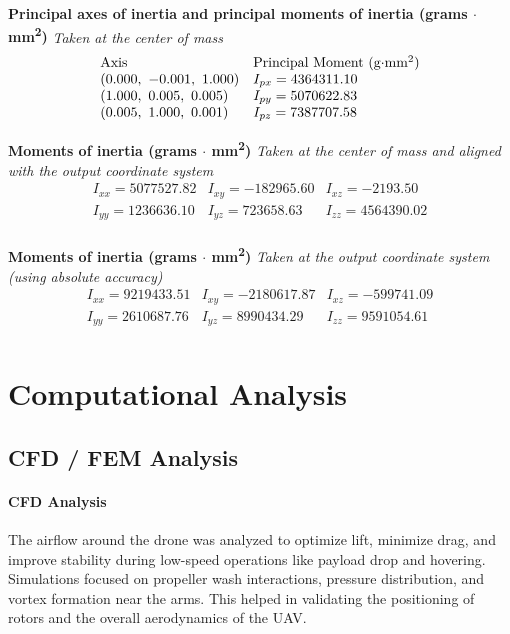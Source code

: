 \documentclass[12pt]{report}
\begin{document}
\vspace{1em}
\textbf{Principal axes of inertia and principal moments of inertia (grams $\cdot$ mm\textsuperscript{2})}  
\textit{Taken at the center of mass}  
\[
\begin{array}{lll}
\text{Axis} & \text{Principal Moment (g$\cdot$mm\textsuperscript{2})} \\
( 0.000,\ -0.001,\ 1.000 ) & I_{px} = 4364311.10 \\
( 1.000,\ 0.005,\ 0.005 ) & I_{py} = 5070622.83 \\
( 0.005,\ 1.000,\ 0.001 ) & I_{pz} = 7387707.58 \\
\end{array}
\]

\vspace{1em}
\textbf{Moments of inertia (grams $\cdot$ mm\textsuperscript{2})}  
\textit{Taken at the center of mass and aligned with the output coordinate system}  
\[
\begin{array}{llll}
I_{xx} = 5077527.82 & I_{xy} = -182965.60 & I_{xz} = -2193.50 \\
I_{yy} = 1236636.10 & I_{yz} = 723658.63 & I_{zz} = 4564390.02 \\
\end{array}
\]

\vspace{1em}
\textbf{Moments of inertia (grams $\cdot$ mm\textsuperscript{2})}  
\textit{Taken at the output coordinate system (using absolute accuracy)}  
\[
\begin{array}{llll}
I_{xx} = 9219433.51 & I_{xy} = -2180617.87 & I_{xz} = -599741.09 \\
I_{yy} = 2610687.76 & I_{yz} = 8990434.29 & I_{zz} = 9591054.61 \\
\end{array}
\]

  \chapter{Computational Analysis}
    \section{CFD / FEM Analysis}
    \subsubsection{\large CFD Analysis}
    The airflow around the drone was analyzed to optimize lift, minimize drag, and improve stability during low-speed operations like payload drop and hovering. Simulations focused on propeller wash interactions, pressure distribution, and vortex formation near the arms. This helped in validating the positioning of rotors and the overall aerodynamics of the UAV.
\end{document}
